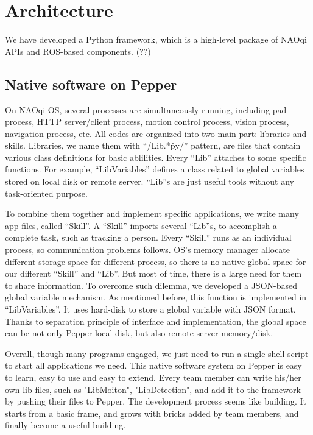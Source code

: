 \section{Architecture}
\label{sec:architecture}

We have developed a Python framework, which is a high-level package of NAOqi APIs and ROS-based components. 
(??)

\subsection{Native software on Pepper}
\label{subsec:native}

On NAOqi OS, several processes are simultaneously running, including pad process, HTTP server/client process, motion control process, vision process, navigation process, etc.
All codes are organized into two main part: libraries and skills. 
Libraries, we name them with “/Lib.*\.py/” pattern, are files that contain various class definitions for basic ablilities. 
Every “Lib” attaches to some specific functions. 
For example, “LibVariables” defines a class related to global variables stored on local disk or remote server. 
“Lib”s are just useful tools without any task-oriented purpose. 

To combine them together and implement specific applications, we write many app files, called “Skill”. 
A “Skill” imports several “Lib”s, to accomplish a complete task, such as tracking a person. 
Every “Skill” runs as an individual process, so communication problems follows. 
OS’s memory manager allocate different storage space for different process, so there is no native global space for our different “Skill” and “Lib”. 
But most of time, there is a large need for them to share information. 
To overcome such dilemma, we developed a JSON-based global variable mechanism. As mentioned before, this function is implemented in “LibVariables”. 
It uses hard-disk to store a global variable with JSON format. 
Thanks to separation principle of interface and implementation, the global space can be not only Pepper local disk, but also remote server memory/disk. 

Overall, though many programs engaged, we just need to run a single shell script to start all applications we need. 
This native software system on Pepper is easy to learn, easy to use and easy to extend. 
Every team member can write his/her own lib files, such as "LibMoiton", "LibDetection", and add it to the framework by pushing their files to Pepper. 
The development process seems like building. It starts from a basic frame, and grows with bricks added by team members, and finally become a useful building.

